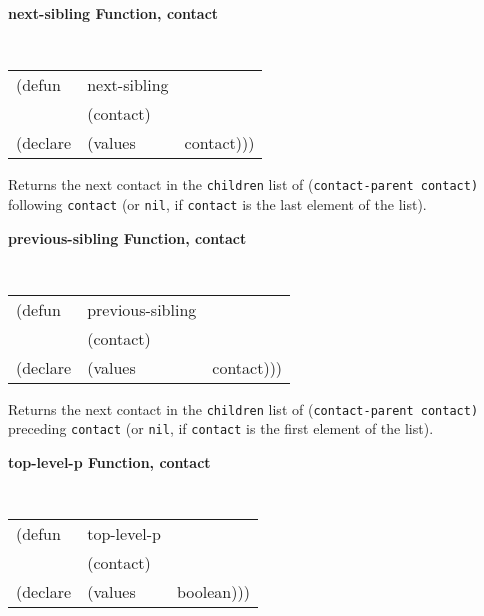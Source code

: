 {\samepage
{\large {\bf next-sibling \hfill Function, contact}} 
\begin{flushright} \parbox[t]{6.125in}{
\tt
\begin{tabular}{lll}
\raggedright
(defun & next-sibling & \\ 
& (contact) \\
(declare &(values  & contact)))
\end{tabular}
\rm

}\end{flushright}}

\begin{flushright} \parbox[t]{6.125in}{
Returns the next contact in the {\tt children} list of {(\tt contact-parent
contact)} following {\tt contact} (or {\tt nil}, if {\tt contact} is the last
element of the list).

}\end{flushright}

{\samepage
{\large {\bf previous-sibling \hfill Function, contact}} 
\begin{flushright} \parbox[t]{6.125in}{
\tt
\begin{tabular}{lll}
\raggedright
(defun & previous-sibling & \\ 
& (contact) \\
(declare &(values  & contact)))
\end{tabular}
\rm

}\end{flushright}}

\begin{flushright} \parbox[t]{6.125in}{
Returns the next contact in the {\tt children} list of {(\tt contact-parent
contact)} preceding {\tt contact} (or {\tt nil}, if {\tt contact} is the first
element of the list).

}\end{flushright}


{\samepage
{\large {\bf top-level-p \hfill Function, contact}} 
\begin{flushright} \parbox[t]{6.125in}{
\tt
\begin{tabular}{lll}
\raggedright
(defun & top-level-p & \\ 
& (contact) \\
(declare &(values  & boolean)))
\end{tabular}
\rm

}\end{flushright}}

